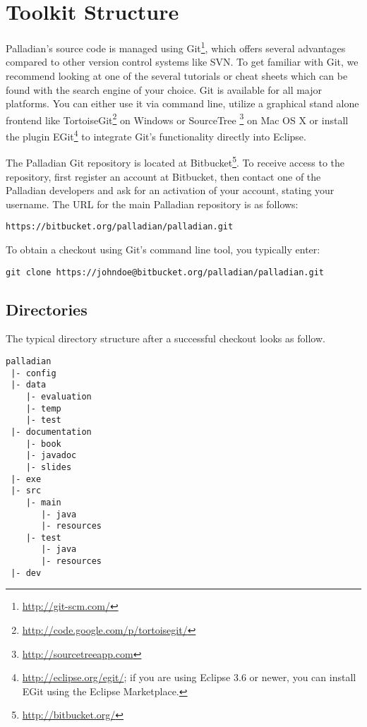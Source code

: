 \chapter{Toolkit Structure}
\label{sec:toolkitstructure}

Palladian's source code is managed using Git\footnote{\url{http://git-scm.com/}}, which offers several advantages compared to other version control systems like SVN. To get familiar with Git, we recommend looking at one of the several tutorials or cheat sheets which can be found with the search engine of your choice. Git is available for all major platforms. You can either use it via command line, utilize a graphical stand alone frontend like TortoiseGit\footnote{\url{http://code.google.com/p/tortoisegit/}} on Windows or SourceTree \footnote{\url{http://sourcetreeapp.com}} on Mac OS X or install the plugin EGit\footnote{\url{http://eclipse.org/egit/}; if you are using Eclipse 3.6 or newer, you can install EGit using the Eclipse Marketplace.} to integrate Git's functionality directly into Eclipse.

The Palladian Git repository is located at Bitbucket\footnote{\url{http://bitbucket.org/}}. To receive access to the repository, first register an account at Bitbucket, then contact one of the Palladian developers and ask for an activation of your account, stating your username. The URL for the main Palladian repository is as follows:

\begin{verbatim}
https://bitbucket.org/palladian/palladian.git
\end{verbatim}

To obtain a checkout using Git's command line tool, you typically enter:

\begin{verbatim}
git clone https://johndoe@bitbucket.org/palladian/palladian.git
\end{verbatim}

\section{Directories}

The typical directory structure after a successful checkout looks as follow.

\begin{verbatim}
palladian
 |- config
 |- data
    |- evaluation
    |- temp
    |- test
 |- documentation
    |- book
    |- javadoc
    |- slides
 |- exe
 |- src
    |- main
       |- java
       |- resources
    |- test
       |- java
       |- resources
 |- dev
\end{verbatim}

